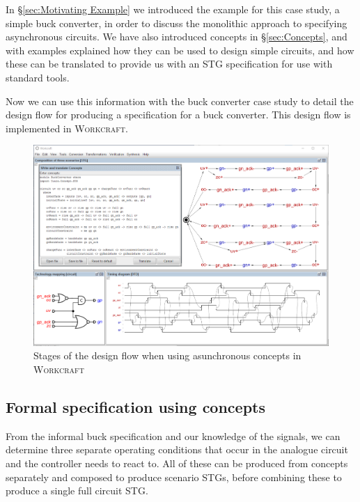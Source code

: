 \documentclass[british,compsoc]{IEEEtran}
\newcommand{\noun}[1]{\textsc{#1}}
\begin{document}
In \S\ref{sec:Motivating Example} we introduced the example for this case study, a simple buck converter,
in order to discuss the monolithic approach to specifying asynchronous circuits. We have also introduced concepts in \S\ref{sec:Concepts},
and with examples explained how they can be used to design simple circuits, and how these can be translated to
provide us with an STG specification for use with standard tools.

Now we can use this information with the buck converter case study to detail the design flow for producing a
specification for a buck converter. This design flow is implemented in \noun{Workcraft}.

\begin{figure}[t]
\begin{centering}
\includegraphics[scale=0.4]{Images/design_flow_wc_screenshot}
\par\end{centering}

\protect\caption{\label{fig:workcraft_screenshot}Stages of the design flow when using asunchronous concepts in \noun{Workcraft}}
\end{figure}

\subsection{Formal specification using concepts}

From the informal buck specification and our knowledge of the signals,
we can determine three separate operating conditions that occur in
the analogue circuit and the controller needs to react to. All of
these can be produced from concepts separately and composed to produce
scenario STGs, before combining these to produce a single full circuit
STG.
\end{document}
